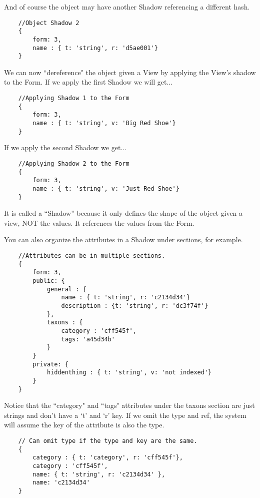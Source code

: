 \documentclass[11pt]{article}
\begin{document}
And of course the object may have another Shadow referencing a different hash.

\begin{lstlisting}
    //Object Shadow 2
    {
        form: 3,
        name : { t: 'string', r: 'd5ae001'}
    }
\end{lstlisting}

We can now ``dereference" the object given a View by applying the View's shadow 
to the Form. If we apply the first Shadow we will get...

\begin{lstlisting}
    //Applying Shadow 1 to the Form
    {
        form: 3,
        name : { t: 'string', v: 'Big Red Shoe'}
    }
\end{lstlisting}

If we apply the second Shadow we get...

\begin{lstlisting}
    //Applying Shadow 2 to the Form
    {
        form: 3,
        name : { t: 'string', v: 'Just Red Shoe'}
    }
\end{lstlisting}

It is called a ``Shadow'' because it only defines the shape of the object given
a view, NOT the values. It references the values from the Form.

\newpage
You can also organize the attributes in a Shadow under sections, for example.

\begin{lstlisting}
    //Attributes can be in multiple sections.
    {
        form: 3,
        public: {
            general : {
                name : { t: 'string', r: 'c2134d34'}
                description : {t: 'string', r: 'dc3f74f'}
            },
            taxons : {
                category : 'cff545f',
                tags: 'a45d34b'
            }
        }
        private: {
            hiddenthing : { t: 'string', v: 'not indexed'}
        }
    }
\end{lstlisting}

Notice that the ``category" and ``tags" attributes under the taxons section are 
just strings and don't have a `t' and `r' key. If we omit the type and ref, the
system will assume the key of the attribute is also the type.

\begin{lstlisting}
    // Can omit type if the type and key are the same.
    {
        category : { t: 'category', r: 'cff545f'},
        category : 'cff545f',
        name: { t: 'string', r: 'c2134d34' },
        name: 'c2134d34'
    }
\end{lstlisting}
\end{document}
